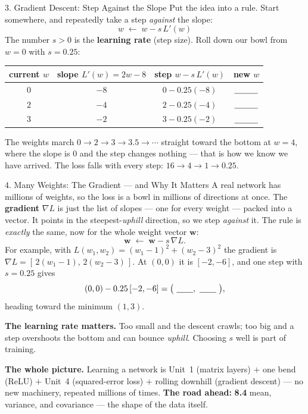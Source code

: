 \documentclass[10pt]{article}
\newcommand{\ww}{\mathbf{w}}
\begin{document}
\begin{notesbox}{3. Gradient Descent: Step Against the Slope}
Put the idea into a rule. Start somewhere, and repeatedly take a step \emph{against} the slope:
\[
  \boxed{\,w \;\leftarrow\; w - s\,L'(w)\,}
\]
The number $s>0$ is the \textbf{learning rate} (step size). Roll down our bowl from $w=0$ with $s=0.25$:
\begin{center}
\renewcommand{\arraystretch}{1.35}
\begin{tabular}{c|c|c|c}
current $w$ & slope $L'(w)=2w-8$ & step $w-s\,L'(w)$ & new $w$\\ \hline
$0$ & $-8$ & $0-0.25(-8)$ & $\blank{1.0cm}$\\
$2$ & $-4$ & $2-0.25(-4)$ & $\blank{1.0cm}$\\
$3$ & $-2$ & $3-0.25(-2)$ & $\blank{1.0cm}$\\
\end{tabular}
\end{center}
The weights march $0\to2\to3\to3.5\to\cdots$ straight toward the bottom at $w=4$, where the slope is $0$ and the
step changes nothing --- that is how we know we have arrived. The loss falls with every step: $16\to4\to1\to0.25$.
\end{notesbox}

\begin{notesbox}{4. Many Weights: The Gradient --- and Why It Matters}
A real network has millions of weights, so the loss is a bowl in millions of directions at once. The
\textbf{gradient} $\nabla L$ is just the list of slopes --- one for every weight --- packed into a vector. It
points in the steepest-\emph{uphill} direction, so we step \emph{against} it. The rule is \emph{exactly} the
same, now for the whole weight vector $\ww$:
\[
  \ww \;\leftarrow\; \ww - s\,\nabla L.
\]
For example, with $L(w_1,w_2)=(w_1-1)^2+(w_2-3)^2$ the gradient is $\nabla L=[\,2(w_1-1),\,2(w_2-3)\,]$. At
$(0,0)$ it is $[-2,-6]$, and one step with $s=0.25$ gives
\[
  (0,0)-0.25\,[-2,-6]=\big(\ \blank{0.7cm},\ \blank{0.7cm}\ \big),
\]
heading toward the minimum $(1,3)$.

\vspace{2pt}
\textbf{The learning rate matters.} Too small and the descent crawls; too big and a step overshoots the bottom
and can bounce \emph{uphill}. Choosing $s$ well is part of training.

\vspace{2pt}
\textbf{The whole picture.} Learning a network is Unit~1 (matrix layers) $+$ one bend (ReLU) $+$ Unit~4
(squared-error loss) $+$ rolling downhill (gradient descent) --- no new machinery, repeated millions of times.
\textbf{The road ahead:} \textbf{8.4} mean, variance, and covariance --- the shape of the data itself.
\end{notesbox}
\end{document}
